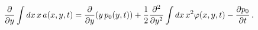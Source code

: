 \begin{equation}
\frac{\partial}{\partial y} \int dx\, x\, a(x,y,t) = 
\frac{\partial}{\partial y} (y\, p_0(y,t)) +
  {1\over 2}\frac{\partial^2}{\partial y^2}
  \int dx\, x^2\varphi(x,y,t) - \frac{\partial p_0}{\partial t}\, .
\label{eq15}
\end{equation}

